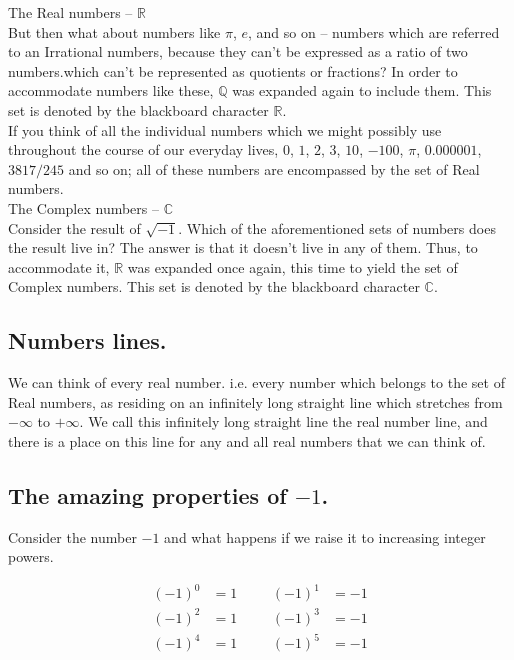 \documentclass{article}
\begin{document}
\textbullet \; The Real numbers -- $\mathbb{R}$\\

But then what about numbers like $\pi$, $e$, and so on -- numbers which are referred to an Irrational numbers,
because they can't be expressed as a ratio of two numbers.which can't be represented as quotients or fractions? In
order to accommodate numbers like these, $\mathbb{Q}$ was expanded again to include them. This set is denoted by
the blackboard character $\mathbb{R}$.\\

If you think of all the individual numbers which we might possibly use throughout the course of our everyday lives, $0$, $1$, $2$, 
$3$, $10$, $-100$, $\pi$, $0.000001$, $3817/245$ and so on; all of these numbers are encompassed by the set of 
Real numbers.\\

\textbullet \; The Complex numbers -- $\mathbb{C}$\\

Consider the result of $\sqrt{-1}$. Which of the aforementioned sets of numbers does the result live in? The answer
is that it doesn't live in any of them. Thus, to accommodate it, $\mathbb{R}$ was expanded once again, this time to
yield the set of Complex numbers. This set is denoted by the blackboard character $\mathbb{C}$.\\


\subsection{Numbers lines.}

We can think of every real number. i.e. every number which belongs to the set of Real numbers, as residing on an infinitely long straight line which stretches from
$-\infty$ to $+\infty$. We call this infinitely long straight line the real number line, and there is a place on this
line for any and all real numbers that we can think of.


\subsection{The amazing properties of $-1$.}

Consider the number $-1$ and what happens if we raise it to increasing integer powers.

\begin{align*}
(-1)^{0} &= 1  \;\;\; & \;\;\; (-1)^{1} &= -1 \\
(-1)^{2} &= 1  \;\;\; & \;\;\; (-1)^{3} &= -1 \\
(-1)^{4} &= 1  \;\;\; & \;\;\; (-1)^{5} &= -1
\end{align*}
\end{document}
